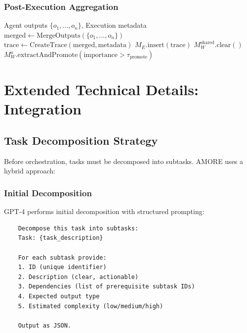 \documentclass{article}
\theoremstyle{plain}
\theoremstyle{definition}
\theoremstyle{remark}
\begin{document}
\subsubsection{Post-Execution Aggregation}

\begin{algorithm}[H]
	\caption{Post-Execution Memory Aggregation}
	\begin{algorithmic}[1]
		\REQUIRE Agent outputs $\{o_1, ..., o_n\}$, Execution metadata
		\STATE $\text{merged} \leftarrow \text{MergeOutputs}(\{o_1, ..., o_n\})$
		\STATE $\text{trace} \leftarrow \text{CreateTrace}(\text{merged}, \text{metadata})$
		\STATE $M_E.\text{insert}(\text{trace})$
		\STATE $M_W^{\text{shared}}.\text{clear}()$
		\STATE $M_W^a.\text{extractAndPromote}(\text{importance} > \tau_{\text{promote}})$
		\ENDFOR
	\end{algorithmic}
\end{algorithm}


\section{Extended Technical Details: Integration}
\label{sec:integration_extended}

\subsection{Task Decomposition Strategy}
\label{sec:decomposition}

Before orchestration, tasks must be decomposed into subtasks. AMORE uses a hybrid approach:

\subsubsection{Initial Decomposition}

GPT-4 performs initial decomposition with structured prompting:
\begin{verbatim}
	Decompose this task into subtasks:
	Task: {task_description}
	
	For each subtask provide:
	1. ID (unique identifier)
	2. Description (clear, actionable)
	3. Dependencies (list of prerequisite subtask IDs)
	4. Expected output type
	5. Estimated complexity (low/medium/high)
	
	Output as JSON.
\end{verbatim}
\end{document}
